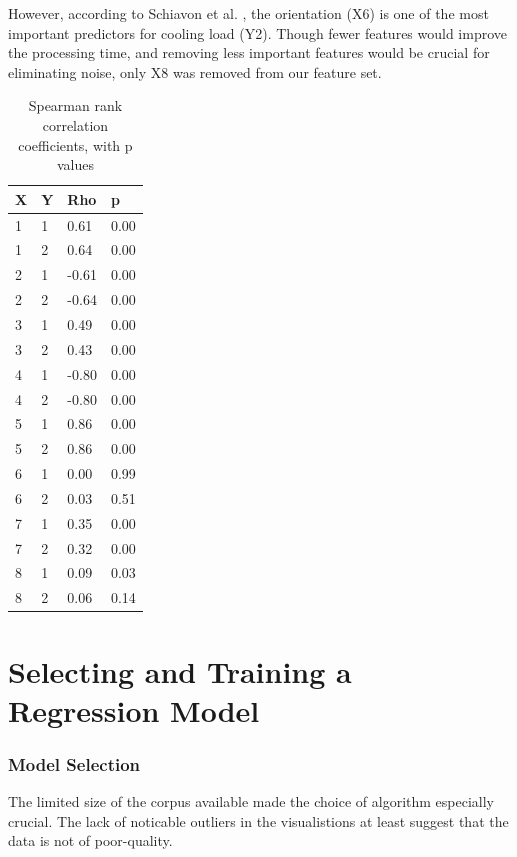 \documentclass[12pt]{article}
\begin{document}
However, according to Schiavon et al. \cite{schiavon_lee_bauman_webster_2010}, the orientation (X6) is one of the most important predictors for cooling load (Y2). Though fewer features would improve the processing time, and removing less important features would be crucial for  eliminating noise, only X8 was removed from our feature set.

\begin{table}[!ht]
\centering
\label{tbl:spearman-table}
\begin{tabular}{||l|l|l|l||}
\hline
X    				& Y & Rho   & p    \\
\hline
1                   & 1 & 0.61  & 0.00 \\
1                   & 2 & 0.64  & 0.00 \\
2                   & 1 & -0.61 & 0.00 \\
2                   & 2 & -0.64 & 0.00 \\
3                   & 1 & 0.49  & 0.00 \\
3                   & 2 & 0.43  & 0.00 \\
4                   & 1 & -0.80 & 0.00 \\
4                   & 2 & -0.80 & 0.00 \\
5                   & 1 & 0.86  & 0.00 \\
5                   & 2 & 0.86  & 0.00 \\
6                   & 1 & 0.00  & 0.99 \\%
6                   & 2 & 0.03  & 0.51 \\
7                   & 1 & 0.35  & 0.00 \\
7                   & 2 & 0.32  & 0.00 \\
8                   & 1 & 0.09  & 0.03 \\
8                   & 2 & 0.06  & 0.14 \\
\hline
\end{tabular}
\caption{Spearman rank correlation coefficients, with p values}
\end{table}

\part{Selecting and Training a Regression Model}

\section{Model Selection}
The limited size of the corpus available made the choice of algorithm especially crucial. The lack of noticable outliers in the visualistions at least suggest that the data is not of poor-quality. 
\end{document}
